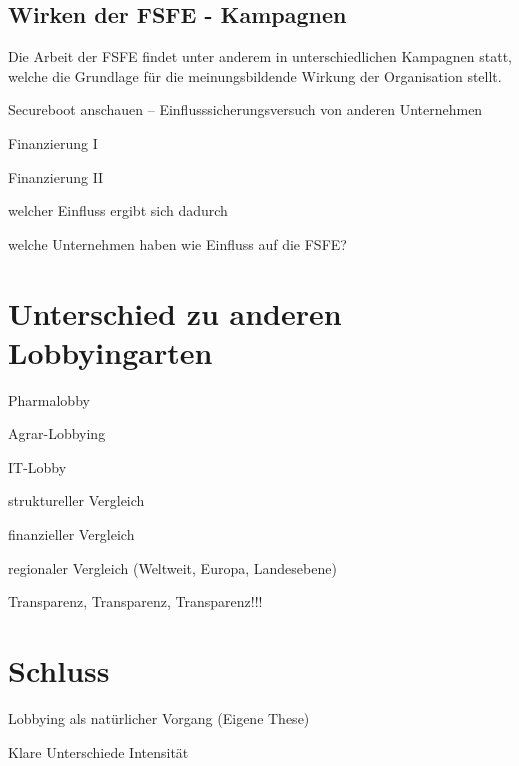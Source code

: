 \subsection{Wirken der FSFE - Kampagnen}
Die Arbeit der FSFE findet unter anderem in unterschiedlichen Kampagnen statt, 
welche die Grundlage für die meinungsbildende Wirkung der Organisation stellt.
\begin{itemize*}
    \item Secureboot anschauen -- Einflusssicherungsversuch von anderen
    Unternehmen
\end{itemize*}

\begin{itemize*}
\item Finanzierung I
\item Finanzierung II
\item welcher Einfluss ergibt sich dadurch
\item welche Unternehmen haben wie Einfluss auf die FSFE?
\end{itemize*}

\section{Unterschied zu anderen Lobbyingarten}
\begin{itemize*}
\item Pharmalobby \cite{BeckLobbyGesundwe}
\item Agrar-Lobbying
\item IT-Lobby
\item struktureller Vergleich
\item finanzieller Vergleich
\item regionaler Vergleich (Weltweit, Europa, Landesebene)
\item Transparenz, Transparenz, Transparenz!!!
\end{itemize*}

\section{Schluss}
\begin{itemize*}
\item Lobbying als natürlicher Vorgang (Eigene These)
\item Klare Unterschiede Intensität
\end{itemize*}

\newpage



\listoftodos


